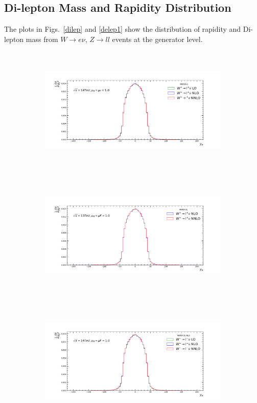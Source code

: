 \subsection{Di-lepton Mass and Rapidity Distribution}
The plots in Figs.~\ref{dilep} and \ref{delep1} show the distribution of rapidity and Di-lepton mass from $W\rightarrow e\nu$, $Z\rightarrow ll$ events at the generator level.
\begin{figure}[H]
\centering
\begin{subfigure}{0.49\textwidth}
\includegraphics[height=6cm ,width=\textwidth]{chapter4/WpYE14.pdf}
\vspace*{-8mm}
\caption{}
\label{wpey14}
\end{subfigure}
\begin{subfigure}{0.49\textwidth}
\includegraphics[height=6cm, width=\textwidth]{chapter4/WpYE13.pdf}
\vspace*{-8mm}
\caption{}
\label{wpey13}
\end{subfigure}
\begin{subfigure}{0.49\textwidth}
\includegraphics[height=6cm, width=\textwidth]{chapter4/WmYE14.pdf}

\end{subfigure}
\end{figure}
